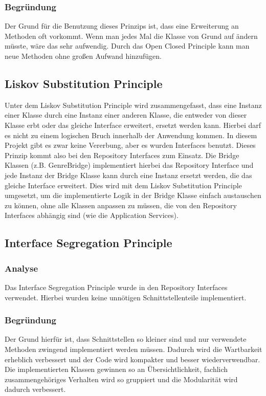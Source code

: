         \subsubsection{Begründung}
        Der Grund für die Benutzung dieses Prinzips ist, dass eine Erweiterung an Methoden oft vorkommt. Wenn man jedes Mal die Klasse von Grund auf ändern müsste, wäre das sehr aufwendig. Durch das Open Closed Principle kann man neue Methoden ohne großen Aufwand hinzufügen.

    \subsection{Liskov Substitution Principle}
        Unter dem Liskov Substitution Principle wird zusammengefasst, dass eine Instanz einer Klasse durch eine Instanz einer anderen Klasse, die entweder von dieser Klasse erbt oder das gleiche Interface erweitert, ersetzt werden kann. Hierbei darf es nicht zu einem logischen Bruch innerhalb der Anwendung kommen. In diesem Projekt gibt es zwar keine Vererbung, aber es wurden Interfaces benutzt. Dieses Prinzip kommt also bei den Repository Interfaces zum Einsatz. Die Bridge Klassen (z.B. GenreBridge) implementiert hierbei das Repository Interface und jede Instanz der Bridge Klasse kann durch eine Instanz ersetzt werden, die das gleiche Interface erweitert. Dies wird mit dem Liskov Substitution Principle umgesetzt, um die implementierte Logik in der Bridge Klasse einfach austauschen zu können, ohne alle Klassen anpassen zu müssen, die von den Repository Interfaces abhängig sind (wie die Application Services).

    \subsection{Interface Segregation Principle}
    
        \subsubsection{Analyse}
        Das Interface Segregation Principle wurde in den Repository Interfaces verwendet. Hierbei wurden keine unnötigen Schnittstellenteile implementiert.
        
        \subsubsection{Begründung}
        Der Grund hierfür ist, dass Schnittstellen so kleiner sind und nur verwendete Methoden zwingend implementiert werden müssen. Dadurch wird die Wartbarkeit erheblich verbessert und der Code wird kompakter und besser wiederverwendbar. Die implementierten Klassen gewinnen so an Übersichtlichkeit, fachlich zusammengehöriges Verhalten wird so gruppiert und die Modularität wird dadurch verbessert.

